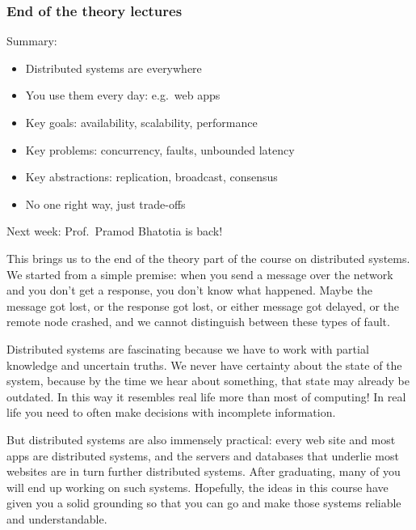 \begin{frame}
    \label{s:conclusions}
    \frametitle{End of the theory lectures}
    Summary:
    \begin{itemize}
        \item Distributed systems are everywhere
        \item You use them every day: e.g.\ web apps
        \item Key goals: availability, scalability, performance
        \item Key problems: concurrency, faults, unbounded latency
        \item Key abstractions: replication, broadcast, consensus
        \item No one right way, just trade-offs\\[1em]
    \end{itemize}
    Next week: Prof.\ Pramod Bhatotia is back!
\end{frame}
\label{l:conclusions}

This brings us to the end of the theory part of the course on distributed systems.
We started from a simple premise: when you send a message over the network and you don't get a response, you don't know what happened.
Maybe the message got lost, or the response got lost, or either message got delayed, or the remote node crashed, and we cannot distinguish between these types of fault.

Distributed systems are fascinating because we have to work with partial knowledge and uncertain truths.
We never have certainty about the state of the system, because by the time we hear about something, that state may already be outdated.
In this way it resembles real life more than most of computing!
In real life you need to often make decisions with incomplete information.

But distributed systems are also immensely practical: every web site and most apps are distributed systems, and the servers and databases that underlie most websites are in turn further distributed systems.
After graduating, many of you will end up working on such systems.
Hopefully, the ideas in this course have given you a solid grounding so that you can go and make those systems reliable and understandable.


\footnotesize

{}


